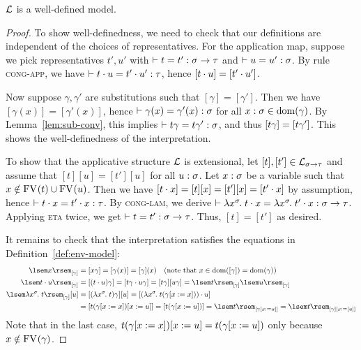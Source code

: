 \begin{prop} \label{prop:tm-model}
$\mathcal{L}$ is a well-defined model.
\begin{proof}
To show well-definedness, we need to check that our definitions are independent of the choices of representatives. For the application map, suppose we pick representatives $t', u'$ with $\vdash t = t' : \sigma \to \tau$ and $\vdash u = u' : \sigma$. By rule \textsc{cong-app}, we have $\vdash t \cdot u = t' \cdot u' : \tau$, hence $[t \cdot u] = [t' \cdot u']$.

Now suppose $\gamma, \gamma'$ are substitutions such that $[\gamma] = [\gamma']$. Then we have $[\gamma(x)] = [\gamma'(x)]$, hence $\vdash \gamma(x) = \gamma'(x) : \sigma$ for all $x : \sigma \in \mathrm{dom}(\gamma)$. By Lemma~\ref{lem:sub-conv}, this implies $\vdash t \gamma = t \gamma' : \sigma$, and thus $[t \gamma] = [t \gamma']$. This shows the well-definedness of the interpretation.

To show that the applicative structure $\mathcal{L}$ is extensional, let $[t], [t'] \in \mathcal{L}_{\sigma \to \tau}$ and assume that $[t][u] = [t'][u]$ for all $u : \sigma$. Let $x : \sigma$ be a variable such that $x \notin \mathrm{FV}_{}(t) \cup \mathrm{FV}_{}(u)$. Then we have $[t \cdot x] = [t][x] = [t'][x] = [t' \cdot x]$ by assumption, hence $\vdash t \cdot x = t' \cdot x : \tau$. By \textsc{cong-lam}, we derive $\vdash \lambda x^{\sigma}\hspace{-1pt}.\;t \cdot x = \lambda x^{\sigma}\hspace{-1pt}.\;t' \cdot x : \sigma \to \tau$. Applying \textsc{eta} twice, we get $\vdash t = t' : \sigma \to \tau$. Thus, $[t] = [t']$ as desired.

It remains to check that the interpretation satisfies the equations in Definition~\ref{def:env-model}:
\begin{align*}
\sint{x}{[\gamma]} &= [\subst{x}{\gamma}] = [\gamma(x)] = [\gamma](x)
    \quad \text{(note that $x \in \dom{[\gamma]} = \dom{\gamma}$)} \\
\sint{\app{t}{u}}{[\gamma]}
    &= [\subst{(\app{t}{u})}{\gamma}]
     = [\app{\subst{t}{\gamma}}{\subst{u}{\gamma}}]
     = [\subst{t}{\gamma}] [\subst{u}{\gamma}]
     = \sint{t}{[\gamma]} \sint{u}{[\gamma]} \\
\sint{\lamv{x}{\sigma}{t}}{[\gamma]} [u]
    &= [\subst{(\lamv{x}{\sigma}{t})}{\gamma}] [u]
     = [\app{(\lamv{x}{\sigma}{\subst{t}{(\updsub{\gamma}{x}{x})}})}{u}] \\
    &= [\subst{t}{\updsub{(\updsub{\gamma}{x}{x})}{x}{u}}]
     = [\subst{t}{(\updsub{\gamma}{x}{u})}]
     = \sint{t}{[\updsub{\gamma}{x}{u}]}
     = \sint{t}{\updenv{[\gamma]}{x}{[u]}}
\end{align*}
Note that in the last case, $t (\gamma[x := x]) [x := u] = t (\gamma[x := u])$ only because $x \notin \mathrm{FV}_{}(\gamma)$.
\end{proof}
\end{prop}

